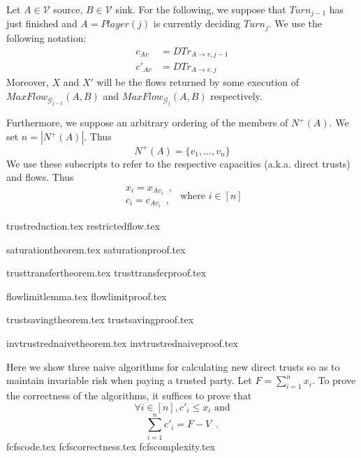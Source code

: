 \documentclass[11pt]{llncs}
\begin{document}
  Let $A \in \mathcal{V}$ source, $B \in \mathcal{V}$ sink. For the following, we suppose that $Turn_{j-1}$ has just finished
  and $A = Player\left(j\right)$ is currently deciding $Turn_j$. We use the following notation:
  \begin{align*}
     c_{Av} &= DTr_{A \rightarrow v, j-1} \\
     c'_{Av} &= DTr_{A \rightarrow v, j}
  \end{align*}
  Moreover, $X$ and $X'$ will be the flows returned by some execution of
  $MaxFlow_{\mathcal{G}_{j-1}}\left(A, B\right)$ and $MaxFlow_{\mathcal{G}_j}\left(A, B\right)$ respectively.

  Furthermore, we suppose an arbitrary ordering of the members of $N^{+}\left(A\right)$. We set $n = |N^{+}\left(A\right)|$.
  Thus
  \begin{equation*}
     N^{+}\left(A\right) = \{v_1, ..., v_n\}
  \end{equation*}
  We use these subscripts to refer to the respective capacities (a.k.a. direct trusts) and flows. Thus
  \begin{equation*}
     \begin{array}{l}
        x_i = x_{Av_i} \enspace, \\
        c_i = c_{Av_i} \enspace,
     \end{array}
     \mbox{ where } i \in [n]
  \end{equation*}

  {trustreduction.tex}
  {restrictedflow.tex}

  {saturationtheorem.tex}
  {saturationproof.tex}

  {trusttransfertheorem.tex}
  {trusttransferproof.tex}

  {flowlimitlemma.tex}
  {flowlimitproof.tex}

  {trustsavingtheorem.tex}
  {trustsavingproof.tex}

  {invtrustrednaivetheorem.tex}
  {invtrustrednaiveproof.tex}


  Here we show three naive algorithms for calculating new direct trusts so as to maintain invariable risk when paying
  a trusted party. Let $F = \sum\limits_{i=1}^{n}x_i$. To prove the correctness of the algorithms, it suffices to prove that
  \begin{equation}
  \label{naive:req1}
     \forall i \in [n], c'_i \leq x_i \mbox{ and}
  \end{equation}
  \begin{equation}
  \label{naive:req2}
     \sum\limits_{i=1}^{n}c'_i = F - V \enspace.
  \end{equation}
  {fcfscode.tex}
  {fcfscorrectness.tex}
  {fcfscomplexity.tex}
\end{document}
